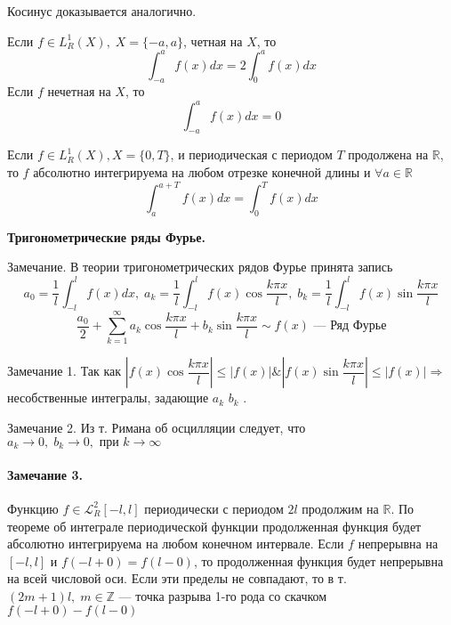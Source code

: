 Косинус доказывается аналогично.
\begin{greyTheorem}
	Если $ f \in L_R^1(X),\; X =\{ -a,a \} $, четная на $ X $, то \[
	\int_{-a}^{a} f(x)dx = 2 \int_{0}^{a} f(x)dx
	\]
	Если $ f $ нечетная на $ X $, то \[
	\int_{-a}^a f(x)dx = 0
	\]
\end{greyTheorem}
\begin{greyTheorem}
	Если $ f \in L_R^1(X), X = \{ 0,T \} $, и периодическая с периодом $ T $ продолжена на $ \mathbb{R} $, то $ f$ абсолютно интегрируема на любом отрезке конечной длины и $ \forall a \in \mathbb{R} $\[ \int_{a}^{a+T} f(x)dx = \int_{0}^T f(x)dx \]
\end{greyTheorem}

\textbf{Тригонометрические ряды Фурье.}

\begin{greySmth}{Замечание.}
	В теории тригонометрических рядов Фурье принята запись
	\[
	a_0 = \dfrac{1}{l} \int_{-l}^l f(x)dx,\; a_k =\dfrac{1}{l} \int_{-l}^lf(x) \cos\dfrac{k\pi x}{l},\; b_k=\dfrac{1}{l} \int_{-l}^l f(x) \sin \dfrac{k \pi x}{l}
	\]
\[
\frac{a_0}{2} + \sum_{k=1}^\infty a_k\cos \dfrac{k\pi x}{l} + b_k \sin \dfrac{k\pi x}{l} \sim f(x) \text{ --- Ряд Фурье}
\]
\end{greySmth}

\begin{greySmth}{Замечание 1.}
	Так как 
	$
	\left|f(x) \cos \dfrac{k \pi x}{l} \right| \leqslant |f(x)| \& \left|f(x)\sin \dfrac{k\pi x}{l}\right| \leqslant |f(x)| \Rightarrow$  несобственные интегралы, задающие  $a_k$  $b_k$ .
\end{greySmth}

\begin{greySmth}{Замечание 2.}
	Из т. Римана об осцилляции следует, что $ a_k \rightarrow 0,\; b_k \rightarrow 0,\text{ при } k \rightarrow \infty $
\end{greySmth}


\paragraph{Замечание 3.} Функцию $ f \in  \mathcal{L}_R^2[-l,l]$ периодически с периодом $ 2l $ продолжим на $ \mathbb{R} $. По теореме об интеграле периодической функции продолженная функция будет абсолютно интегрируема на любом конечном интервале. Если $ f $ непрерывна на $ [-l,l] $ и $ f(-l+0)=f(l-0) $, то продолженная функция будет непрерывна на всей числовой оси. Если эти пределы не совпадают, то в т. $ (2m+1)l,\; m\in \mathbb{Z} $ --- точка разрыва 1-го рода со скачком $ f(-l+0)-f(l-0) $